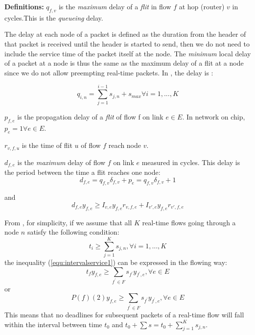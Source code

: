 \documentclass[conference, twocolumn]{IEEEtran}
\theoremstyle{definition}
\begin{document}
{\textbf{Definitions:}}
$q_{f,v}$ is the {\em maximum} delay of a {\em flit} in flow $f$ at
hop (router) $v$ in cycles.This is the {\em queueing} delay.

The delay at each node of a packet is defined as the duration from the header
of that  packet is received until the header is started to send, then we do not
need to include the service time of the packet itself at the node. The {\em
minimum} local delay of a packet at a node is thus the same as the maximum
delay of a flit at a node since we do not allow preempting real-time packets. In
\cite{Ferrari90ascheme}, the delay is :

\begin{equation}\label{equ:nodedelay1}
q_{i,n} = \sum_{j=1}^{i-1}s_{j,n}+s_{max} \forall i = 1, ..., K
\end{equation}

 
$p_{f,e}$ is the propagation delay of a {\em flit} of flow f on link $e
\in E$. In network on chip, $p_e=1 \forall e \in E$.

$r_{v,f,u}$ is the time of flit $u$ of flow $f$ reach node $v$.  

$d_{f,e}$ is the {\em maximum} delay of flow $f$ on link $e$ measured in
cycles. This delay is the period between the time a flit reaches one node:
\begin{equation}\label{equ:edgeDelay}
d_{f,e} = q_{f,v}\delta_{f,v} + p_{e} = q_{f,v}\delta_{f,v} + 1 
\end{equation}

and
\begin{equation} 
d_{f,e}y_{f,e} \geq I_{v,e}y_{f,e}r_{v,f,e} + I_{v',e}y_{f,e}r_{v',f,e}
\end{equation}

From \cite{Ferrari90ascheme}, for simplicity, if we assume that all $K$ 
real-time flows going through a node $n$ satisfy the following condition:
\begin{equation}\label{equ:intervalservice1}
t_i \geq \sum_{j=1}^Ks_{j,n}, \forall i = 1,...,K
\end{equation}
the inequality (\ref{equ:intervalservice1}) can be expressed in the flowing way:
\begin{equation}
t_f y_{f,e}\geq \sum_{f^{'} \in F} s_{f^{'}}y_{f^{'},e}, \forall e \in E
\end{equation}
or
\begin{equation}\label{equ:intervalservice3}
P(f)(2) y_{f,e}\geq \sum_{f^{'} \in F} s_{f^{'}}y_{f^{'},e}, \forall e \in E
\end{equation}
This means that no deadlines for subsequent packets of a real-time flow will
fall within the interval between time $t_0$ and $t_0 + \sum s = t_0 +
\sum_{j=1}^Ks_{j,n}$.
\end{document}
